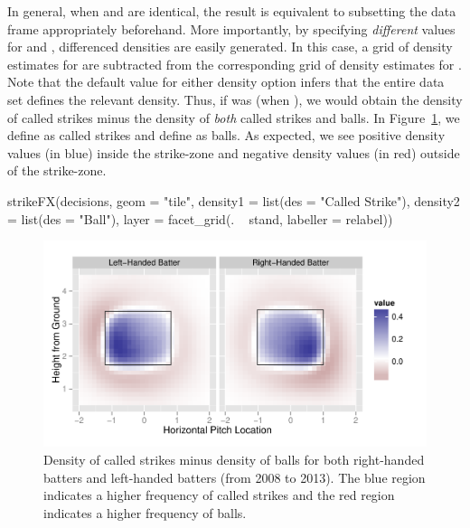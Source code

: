 \begin{article}
In general, when  and  are identical,
the result is equivalent to subsetting the data frame appropriately
beforehand. More importantly, by specifying \emph{different} values
for  and , differenced densities are
easily generated. In this case, a grid of density estimates for 
are subtracted from the corresponding grid of density estimates for
. Note that the default  value for either
density option infers that the entire data set defines the relevant
density. Thus, if  was  (when ),
we would obtain the density of called strikes minus the density of
\emph{both} called strikes and balls. In Figure~\ref{fig:strikesVSballs},
we define  as called strikes and define 
as balls. As expected, we see positive density values (in blue) inside
the strike-zone and negative density values (in red) outside of the
strike-zone. 
%
\begin{Schunk}
\begin{Sinput}
strikeFX(decisions, geom = "tile", density1 = list(des = "Called Strike"), 
  density2 = list(des = "Ball"), layer = facet_grid(. ~ stand, labeller = relabel)) 
\end{Sinput}
\end{Schunk}
%

\begin{figure}[h]
\centerline{\includegraphics[scale = 1]{strikesVSballs.pdf}}

\caption{\label{fig:strikesVSballs} Density of called strikes minus density
of balls for both right-handed batters and left-handed batters (from
2008 to 2013). The blue region indicates a higher frequency of called
strikes and the red region indicates a higher frequency of balls.}
\end{figure}



\end{article}
